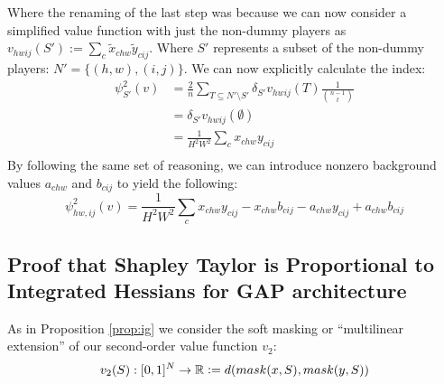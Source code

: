 \documentclass{article} %
\newcommand{\defeq}{\vcentcolon=}
\begin{document}
Where the renaming of the last step was because we can now consider a simplified value function with just the non-dummy players as $v_{hwij}(S') := \sum_c \tilde{x}_{chw} \tilde{y}_{cij}$. Where $S'$ represents a subset of the non-dummy players: $N' = \{(h,w), (i,j)\}$. We can now explicitly calculate the index:
\begin{align*}
\psi_{S'}^2(v) &= \frac{2}{n} \sum_{T \subseteq N' \setminus S'} \delta_{S'} v_{hwij}(T) \frac{1}{\binom{n-1}{t}}\\
&= \delta_{S'} v_{hwij}(\emptyset)\\
&=  \frac{1}{H^2W^2}\sum_c x_{chw} y_{cij} \\
\end{align*}
By following the same set of reasoning, we can introduce nonzero background values $a_{chw}$ and $b_{cij}$ to yield the following:
\begin{equation}
\psi_{hw,ij}^2(v) = \frac{1}{H^2W^2}\sum_c x_{chw} y_{cij} -  x_{chw} b_{cij} -  a_{chw} y_{cij} +  a_{chw} b_{cij}
\end{equation}

\subsection{Proof that Shapley Taylor is Proportional to Integrated Hessians for GAP architecture}

As in Proposition \ref{prop:ig} we consider the soft masking or ``multilinear extension'' of our second-order value function $v_2$:
\begin{equation}
    v_2(S) : [0,1]^N \to \mathbb{R} \defeq d(mask(x, S), mask(y, S))
\end{equation}
\end{document}
